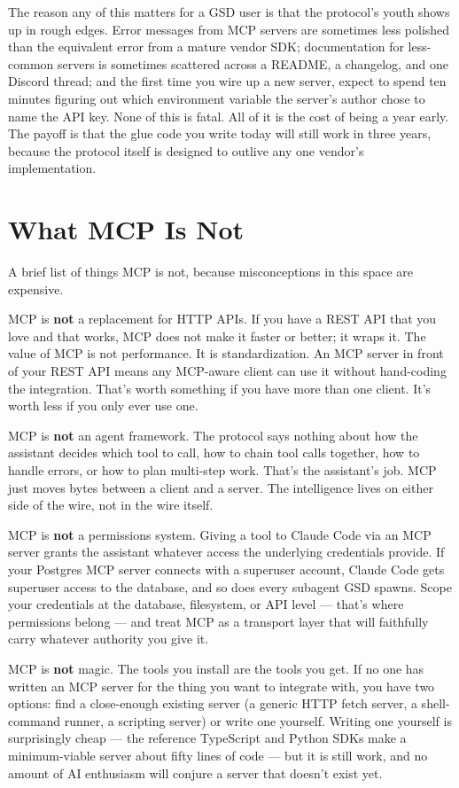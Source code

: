 \documentclass[11pt,letterpaper,openany]{book}
\begin{document}
The reason any of this matters for a GSD user is that the protocol's
youth shows up in rough edges. Error messages from MCP servers are
sometimes less polished than the equivalent error from a mature
vendor SDK; documentation for less-common servers is sometimes
scattered across a README, a changelog, and one Discord thread; and
the first time you wire up a new server, expect to spend ten minutes
figuring out which environment variable the server's author chose to
name the API key. None of this is fatal. All of it is the cost of
being a year early. The payoff is that the glue code you write today
will still work in three years, because the protocol itself is
designed to outlive any one vendor's implementation.

\section{What MCP Is Not}

A brief list of things MCP is not, because misconceptions in this
space are expensive.

MCP is \textbf{not} a replacement for HTTP APIs. If you have a REST
API that you love and that works, MCP does not make it faster or
better; it wraps it. The value of MCP is not performance. It is
standardization. An MCP server in front of your REST API means any
MCP-aware client can use it without hand-coding the integration.
That's worth something if you have more than one client. It's
worth less if you only ever use one.

MCP is \textbf{not} an agent framework. The protocol says nothing
about how the assistant decides which tool to call, how to chain
tool calls together, how to handle errors, or how to plan
multi-step work. That's the assistant's job. MCP just moves bytes
between a client and a server. The intelligence lives on either
side of the wire, not in the wire itself.

MCP is \textbf{not} a permissions system. Giving a tool to Claude
Code via an MCP server grants the assistant whatever access the
underlying credentials provide. If your Postgres MCP server
connects with a superuser account, Claude Code gets superuser
access to the database, and so does every subagent GSD spawns.
Scope your credentials at the database, filesystem, or API level
--- that's where permissions belong --- and treat MCP as a
transport layer that will faithfully carry whatever authority you
give it.

MCP is \textbf{not} magic. The tools you install are the tools you
get. If no one has written an MCP server for the thing you want to
integrate with, you have two options: find a close-enough existing
server (a generic HTTP fetch server, a shell-command runner, a
scripting server) or write one yourself. Writing one yourself is
surprisingly cheap --- the reference TypeScript and Python SDKs
make a minimum-viable server about fifty lines of code --- but it
is still work, and no amount of AI enthusiasm will conjure a
server that doesn't exist yet.
\end{document}
